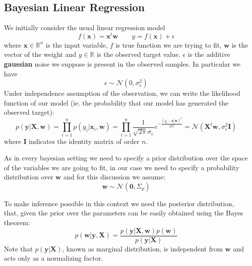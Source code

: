     \subsection{Bayesian Linear Regression}
      \noindent We initially consider the usual linear regression model
      \begin{equation*}
        f(\pmb{x}) = \pmb{x}^{t} \pmb{w} \quad \quad y = f(\pmb{x}) + \epsilon
      \end{equation*}
      where $\pmb{x} \in \mathbb{R}^n$ is the input variable, $f$ is true function we are trying to fit,
      $\pmb{w}$ is the vector of the weight and $y \in \mathbb{R}$ is the observed target value.\newline
      $\epsilon$ is the additive \textbf{gaussian} noise we suppose is present in the observed samples. In particular we have
      \begin{equation*}
        \epsilon \sim \mathcal{N}(0,\sigma^{2}_{e})
      \end{equation*}
      Under independence assumption of the observation, we can write the likelihood function of our model (ie. the probability that
      our model has generated the observed target):
      \begin{equation}
        \label{likelihood}
        p(\pmb{y}|\pmb{X},\pmb{w}) = \prod_{i=1}^{n} p(y_{i}|\pmb{x}_{i},\pmb{w}) = \prod_{i=1}^{n} \frac{1}{\sqrt{2\pi}\sigma_{e}} e^{-\frac{(y_{i}-\pmb{x}_{i}^{t} \pmb{w})^{2}} {2\sigma^{2}_{e}}} =
        \mathcal{N}(\pmb{X}^{t}\pmb{w}, \sigma^{2}_{e} \pmb{I})
      \end{equation}
      where $\pmb{I}$ indicates the identity matrix of order $n$.\newline

      \noindent As in every bayesian setting we need to specify a prior distribution over the space of the variables we are going
      to fit, in our case we need to specify a probability distribution over $\pmb{w}$ and for this discussion we assume:
      \begin{equation*}
        \pmb{w} \sim \mathcal{N}(\pmb{0}, \Sigma_p)
      \end{equation*}

      \noindent To make inference possible in this context we need the posterior distribution, that, given the prior over the parameters
      can be easily obtained using the Bayes theorem:
      \begin{equation}
        p(\pmb{w}|\pmb{y},\pmb{X}) = \frac{p(\pmb{y}|\pmb{X},\pmb{w}) p(\pmb{w})}{p(\pmb{y}|\pmb{X})}
      \end{equation}
      Note that $p(\pmb{y}|\pmb{X})$, known as marginal distribution, is independent from $\pmb{w}$ and acts only as
      a normalizing factor.\newline

